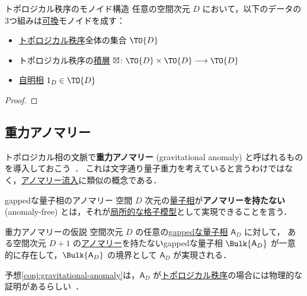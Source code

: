 \documentclass[TQFT_main]{subfiles}
\begin{document}
\begin{mypropph}[label=prop:monoidalTO]{トポロジカル秩序のモノイド構造}
    任意の空間次元 $D$ において，以下のデータの3つ組みは\underline{可換}モノイドを成す：
    \begin{itemize}
        \item \hyperref[def:quantum-phase]{トポロジカル秩序}全体の集合 $\TO{D}$
        \item トポロジカル秩序の\hyperref[def:stacking]{積層} $\boxtimes \colon \TO{D} \times \TO{D} \lto \TO{D}$
        \item \hyperref[def:trivialTO]{自明相} $1_D \in \TO{D}$
    \end{itemize}
\end{mypropph}

\begin{proof}
    
\end{proof}

\subsection{重力アノマリー}

トポロジカル相の文脈で\textbf{重力アノマリー} (gravitational anomaly) と呼ばれるものを導入しておこう~\cite{KongWen2014braidedfusioncategoriesgravitational}．
これは文字通り量子重力を考えていると言うわけではなく，\hyperref[label=hypo:anomaly-inflow]{アノマリー流入}に類似の概念である．

\begin{mydefph}[label=def:anomalousQP]{gappedな量子相のアノマリー}
    空間 $D$ 次元の\hyperref[def:quantum-phase]{量子相}が\textbf{アノマリーを持たない} (anomaly-free) とは，それが\hyperref[def:bosonic-lattice-model]{局所的な格子模型}として実現できることを言う．
\end{mydefph}

\begin{myconjph}[label=conj:gravitational-anomaly]{重力アノマリーの仮説}
    空間次元 $D$ の任意の\hyperref[def:quantum-phase]{gappedな量子相} $\mathsf{A}_D$ に対して，
    ある空間次元 $D+1$ の\hyperref[def:anomalousQP]{アノマリー}を持たないgappedな量子相 $\Bulk{\mathsf{A}_D}$ が一意的に存在して，$\Bulk{\mathsf{A}_D}$ の境界として $\mathsf{A}_D$ が実現される．
\end{myconjph}

予想\ref{conj:gravitational-anomaly}は，$\mathsf{A}_D$ が\hyperref[def:quantum-phase]{トポロジカル秩序}の場合には物理的な証明があるらしい~\cite[Lemma 2, p.19]{KongWen2014braidedfusioncategoriesgravitational}．
\end{document}

